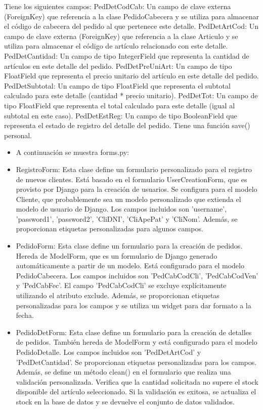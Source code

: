 \documentclass{article}
\begin{document}
\begin{itemize}
\begin{itemize}
\begin{itemize}
                Tiene los siguientes campos:
                PedDetCodCab: Un campo de clave externa (ForeignKey) que referencia a la clase PedidoCabecera y se utiliza para almacenar el código de cabecera del pedido al que pertenece este detalle.
                PedDetArtCod: Un campo de clave externa (ForeignKey) que referencia a la clase Articulo y se utiliza para almacenar el código de artículo relacionado con este detalle.
                PedDetCantidad: Un campo de tipo IntegerField que representa la cantidad de artículos en este detalle del pedido.
                PedDetPreUniArt: Un campo de tipo FloatField que representa el precio unitario del artículo en este detalle del pedido.
                PedDetSubtotal: Un campo de tipo FloatField que representa el subtotal calculado para este detalle (cantidad * precio unitario).
                PedDetTot: Un campo de tipo FloatField que representa el total calculado para este detalle (igual al subtotal en este caso).
                PedDetEstReg: Un campo de tipo BooleanField que representa el estado de registro del detalle del pedido.
                Tiene una función save() personal.
            \end{itemize}
            
        \begin{itemize}
                \item A continuación se muestra forms.py:
                \item RegistroForm: Esta clase define un formulario personalizado para el registro de nuevos clientes. Está basado en el formulario UserCreationForm, que es provisto por Django para la creación de usuarios. Se configura para el modelo Cliente, que probablemente sea un modelo personalizado que extienda el modelo de usuario de Django. Los campos incluidos son 'username', 'password1', 'password2', 'CliDNI', 'CliApePat' y 'CliNom'. Además, se proporcionan etiquetas personalizadas para algunos campos.
                \item PedidoForm: Esta clase define un formulario para la creación de pedidos. Hereda de ModelForm, que es un formulario de Django generado automáticamente a partir de un modelo. Está configurado para el modelo PedidoCabecera. Los campos incluidos son 'PedCabCodCli', 'PedCabCodVen' y 'PedCabFec'. El campo 'PedCabCodCli' se excluye explícitamente utilizando el atributo exclude. Además, se proporcionan etiquetas personalizadas para los campos y se utiliza un widget para dar formato a la fecha.
                \item PedidoDetForm: Esta clase define un formulario para la creación de detalles de pedidos. También hereda de ModelForm y está configurado para el modelo PedidoDetalle. Los campos incluidos son 'PedDetArtCod' y 'PedDetCantidad'. Se proporcionan etiquetas personalizadas para los campos. Además, se define un método clean() en el formulario que realiza una validación personalizada. Verifica que la cantidad solicitada no supere el stock disponible del artículo seleccionado. Si la validación es exitosa, se actualiza el stock en la base de datos y se devuelve el conjunto de datos validados.

\end{itemize}
\end{itemize}
\end{itemize}
\end{document}
